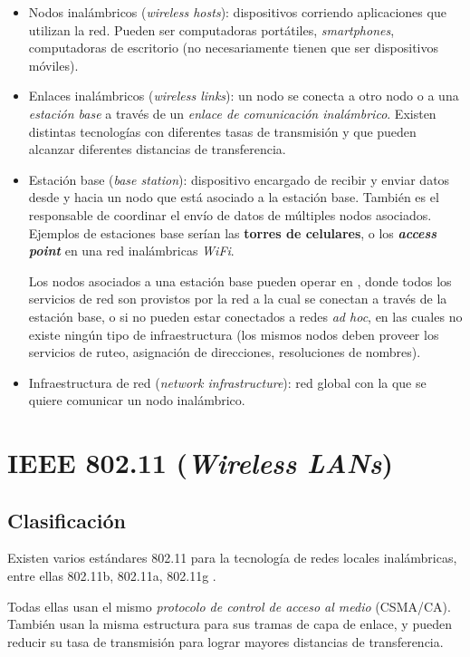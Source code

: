 \begin{itemize}
    \item Nodos inalámbricos (\emph{wireless hosts}): dispositivos corriendo aplicaciones que utilizan la red. Pueden ser computadoras portátiles, \emph{smartphones}, computadoras de escritorio (no necesariamente tienen que ser dispositivos móviles).
    \item Enlaces inalámbricos (\emph{wireless links}): un nodo se conecta a otro nodo o a una \emph{estación base} a través de un \emph{enlace de comunicación inalámbrico}. Existen distintas tecnologías con diferentes tasas de transmisión y que pueden alcanzar diferentes distancias de transferencia.
    \item Estación base (\emph{base station}): dispositivo encargado de recibir y enviar datos desde y hacia un nodo que está asociado a la estación base. También es el responsable de coordinar el envío de datos de múltiples nodos asociados. Ejemplos de estaciones base serían las \textbf{torres de celulares}, o los \textbf{\emph{access point}} en una red inalámbricas \emph{WiFi}.

        Los nodos asociados a una estación base pueden operar en , donde todos los servicios de red son provistos por la red a la cual se conectan a través de la estación base, o si no pueden estar conectados a redes \emph{ad hoc}, en las cuales no existe ningún tipo de infraestructura (los mismos nodos deben proveer los servicios de ruteo, asignación de direcciones, resoluciones de nombres).
    \item Infraestructura de red (\emph{network infrastructure}): red global con la que se quiere comunicar un nodo inalámbrico.
\end{itemize}



\section{IEEE 802.11 (\emph{Wireless LANs})}

\subsection{Clasificación}

Existen varios estándares 802.11 para la tecnología de redes locales inalámbricas, entre ellas 802.11b, 802.11a, 802.11g \autocite{Kurose:Wireless}.

Todas ellas usan el mismo \emph{protocolo de control de acceso al medio} (CSMA/CA). También usan la misma estructura para sus tramas de capa de enlace, y pueden reducir su tasa de transmisión para lograr mayores distancias de transferencia. 

